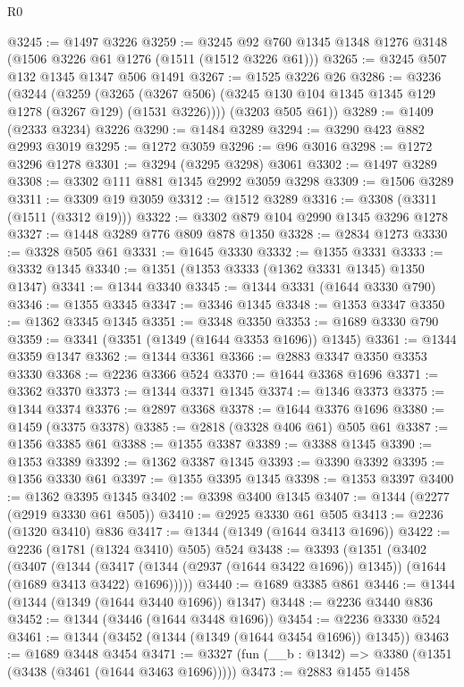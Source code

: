 \begin{lexlean}{R0}
\begin{coremodule}
@3245 := @1497 @3226
@3259 := @3245 @92 @760 @1345 @1348 @1276 @3148 (@1506 @3226 @61 @1276 (@1511 (@1512 @3226 @61)))
@3265 := @3245 @507 @132 @1345 @1347 @506 @1491
@3267 := @1525 @3226 @26
@3286 := @3236
    (@3244
      (@3259
        (@3265 (@3267 @506) (@3245 @130 @104 @1345 @1345 @129 @1278 (@3267 @129) (@1531 @3226))))
      (@3203 @505 @61))
@3289 := @1409 (@2333 @3234) @3226
@3290 := @1484 @3289
@3294 := @3290 @423 @882 @2993 @3019
@3295 := @1272 @3059
@3296 := @96 @3016
@3298 := @1272 @3296 @1278
@3301 := @3294 (@3295 @3298) @3061
@3302 := @1497 @3289
@3308 := @3302 @111 @881 @1345 @2992 @3059 @3298
@3309 := @1506 @3289
@3311 := @3309 @19 @3059
@3312 := @1512 @3289
@3316 := @3308 (@3311 (@1511 (@3312 @19)))
@3322 := @3302 @879 @104 @2990 @1345 @3296 @1278
@3327 := @1448 @3289 @776 @809 @878 @1350
@3328 := @2834 @1273
@3330 := @3328 @505 @61
@3331 := @1645 @3330
@3332 := @1355 @3331
@3333 := @3332 @1345
@3340 := @1351 (@1353 @3333 (@1362 @3331 @1345) @1350 @1347)
@3341 := @1344 @3340
@3345 := @1344 @3331 (@1644 @3330 @790)
@3346 := @1355 @3345
@3347 := @3346 @1345
@3348 := @1353 @3347
@3350 := @1362 @3345 @1345
@3351 := @3348 @3350
@3353 := @1689 @3330 @790
@3359 := @3341 (@3351 (@1349 (@1644 @3353 @1696)) @1345)
@3361 := @1344 @3359 @1347
@3362 := @1344 @3361
@3366 := @2883 @3347 @3350 @3353 @3330
@3368 := @2236 @3366 @524
@3370 := @1644 @3368 @1696
@3371 := @3362 @3370
@3373 := @1344 @3371 @1345
@3374 := @1346 @3373
@3375 := @1344 @3374
@3376 := @2897 @3368
@3378 := @1644 @3376 @1696
@3380 := @1459 (@3375 @3378)
@3385 := @2818 (@3328 @406 @61) @505 @61
@3387 := @1356 @3385 @61
@3388 := @1355 @3387
@3389 := @3388 @1345
@3390 := @1353 @3389
@3392 := @1362 @3387 @1345
@3393 := @3390 @3392
@3395 := @1356 @3330 @61
@3397 := @1355 @3395 @1345
@3398 := @1353 @3397
@3400 := @1362 @3395 @1345
@3402 := @3398 @3400 @1345
@3407 := @1344 (@2277 (@2919 @3330 @61 @505))
@3410 := @2925 @3330 @61 @505
@3413 := @2236 (@1320 @3410) @836
@3417 := @1344 (@1349 (@1644 @3413 @1696))
@3422 := @2236 (@1781 (@1324 @3410) @505) @524
@3438 := @3393
    (@1351
      (@3402
        (@3407
          (@1344
            (@3417 (@1344 (@2937 (@1644 @3422 @1696)) @1345))
            (@1644 (@1689 @3413 @3422) @1696)))))
@3440 := @1689 @3385 @861
@3446 := @1344 (@1344 (@1349 (@1644 @3440 @1696)) @1347)
@3448 := @2236 @3440 @836
@3452 := @1344 (@3446 (@1644 @3448 @1696))
@3454 := @2236 @3330 @524
@3461 := @1344 (@3452 (@1344 (@1349 (@1644 @3454 @1696)) @1345))
@3463 := @1689 @3448 @3454
@3471 := @3327 (fun (__b : @1342) => @3380 (@1351 (@3438 (@3461 (@1644 @3463 @1696)))))
@3473 := @2883 @1455 @1458

\end{coremodule}
\end{lexlean}
